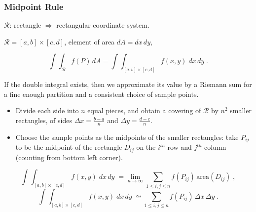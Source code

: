 

\begin{frame}
  \frametitle{Midpoint Rule}

  $\mathcal{R}$: rectangle \pause $\Longrightarrow$ rectangular coordinate system.

  $\mathcal{R} = [a,b] \times [c,d]$, element of area $dA = dx\, dy$,

%
$$\int\!\!\!\int_{\mathcal{R}} f(P) \, dA = \int\!\!\!\int_{[a,b] \times [c,d]} f(x,y) \; dx\, dy\; .$$

\pause If the double integral exists, then we approximate its value by a Riemann sum for a fine enough partition and a consistent choice of sample points.
%
\begin{itemize}
  \item \pause Divide each side into $n$ equal pieces, and obtain a covering of $\mathcal{R}$ by $n^2$ smaller rectangles, of sides $\Delta x = \frac{b-a}{n}$ and $\Delta y = \frac{d-c}{n}$.
  \item \pause Choose the sample points as the midpoints of the smaller rectangles: take $P_{ij}$ to be the midpoint of the rectangle $D_{ij}$ on the $i^{th}$ row and $j^{th}$ column (counting from bottom left corner).
\end{itemize}
%
\pause
$$\int\!\!\!\int_{[a,b] \times [c,d]} f(x,y) \; dx\, dy\;  = \lim_{n \to \infty} \sum_{1\leqslant i,j \leqslant n} f(P_{ij}) \, \text{area}(D_{ij})\; ,$$
%
$$\int\!\!\!\int_{[a,b] \times [c,d]} f(x,y) \; dx\, dy\;  \simeq \sum_{1\leqslant i,j \leqslant n} f(P_{ij}) \, \Delta x \, \Delta y\; .$$
%
\end{frame}
